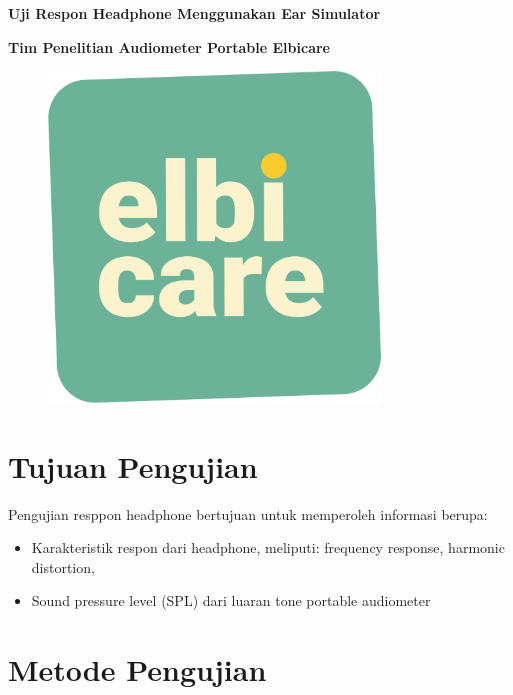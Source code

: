\documentclass{article}
\begin{document}
	\begin{titlepage}
		\centering

		{
			\LARGE
			\bf
			Uji Respon Headphone Menggunakan Ear Simulator
		}

		\bigskip

		{
			\large
			\bf
			Tim Penelitian Audiometer Portable Elbicare
		}
	
		\vfill
	
		\begin{figure}[H]
			\centering
			\includegraphics[width=250pt,angle=0]{images/elbicare-logo}
		\end{figure}

		\vfill
	\end{titlepage}

	\newpage


	\section{Tujuan Pengujian}
	Pengujian resppon headphone bertujuan untuk memperoleh informasi berupa:
	\begin{itemize}
		\item Karakteristik respon dari headphone, meliputi: frequency response, harmonic distortion,
		\item Sound pressure level (SPL) dari luaran tone portable audiometer
	\end{itemize}

	\section{Metode Pengujian}
\end{document}
